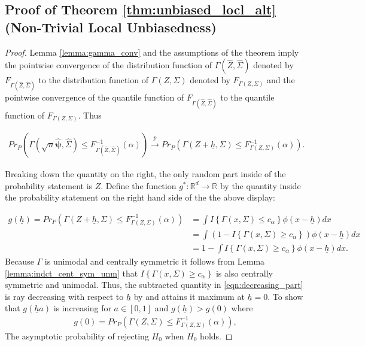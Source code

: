 \documentclass{article}
\newcommand{\vmat}{\Sigma}
\newcommand{\disto}{P}
\newcommand{\rvv}{Z}
\newcommand{\gamestz}{\Gamma(\hat{\rvv}, \hat{\Sigma})}
\newcommand{\gamestp}{\Gamma(\sqrt{n}\hat{\boldsymbol{\psi}}, \hat{\Sigma})}
\newcommand{\gamz}{\Gamma(\rvv, \Sigma)}
\begin{document}
\subsection{Proof of Theorem \ref{thm:unbiased_locl_alt} (Non-Trivial Local Unbiasedness)}

\begin{proof}
Lemma \ref{lemma:gamma_conv} and the assumptions of the theorem imply the pointwise convergence of the distribution function of $\gamestz$ denoted by $F_{\gamestz}$ to the distribution function of $\gamz$ denoted by $F_{\gamz}$ and the pointwise convergence of the quantile function of $F_{\gamestz}$ to the quantile function of $F_{\gamz}$.  Thus

\begin{align*}
	Pr_{\disto}\left(\gamestp \leq F^{-1}_{\gamestz}(\alpha)\right) \xrightarrow{p} Pr_{\disto}\left(\Gamma(Z + \underline{h}, \vmat) \leq F^{-1}_{\gamz}(\alpha)\right).
\end{align*}

Breaking down the quantity on the right, the only random part inside of the probability statement is $Z$.  Define the function $g^* : \mathbb{R}^d \to \mathbb{R}$ by the quantity inside the probability statement on the right hand side of the the above display:

\begin{align}
	g(\underline{h}) = Pr_{\disto}\left(\Gamma(Z + \underline{h}, \Sigma) \leq F^{-1}_{\gamz}(\alpha)\right)  &= \int I\left\{\Gamma(x, \Sigma) \leq c_\alpha\right\} \phi(x - \underline{h}) dx \nonumber \\
	&=  \int \left(1 - I\left\{\Gamma(x, \Sigma) \geq c_\alpha \right\}\right)\phi(x - \underline{h}) dx \nonumber\\
	&= 1 - \int I\left\{\Gamma(x, \Sigma) \geq c_{\alpha}\right\} \phi(x - \underline{h}) dx. \label{eqn:decreasing_part}
\end{align}
Because $\Gamma$ is unimodal and centrally symmetric it follows from Lemma \ref{lemma:indct_cent_sym_unm} that $I\left\{\Gamma(x, \Sigma) \geq c_{\alpha}\right\}$ is also centrally symmetric and unimodal. Thus, the subtracted quantity in \eqref{eqn:decreasing_part} is ray decreasing with respect to $\underline{h}$ by \citep{anderson_integral_1955} and attains it maximum at $\underline{h} = 0$.  To show that $g(\underline{h}a)$ is increasing for $a \in [0, 1]$ and $g(\underline{h}) > g(0)$ where \begin{align*}
	g(0) = Pr_{\disto}\left(\gamz \leq F^{-1}_{\gamz}(\alpha)\right),
\end{align*}
The asymptotic probability of rejecting $H_0$ when $H_0$ holds.
\end{proof}
\end{document}
